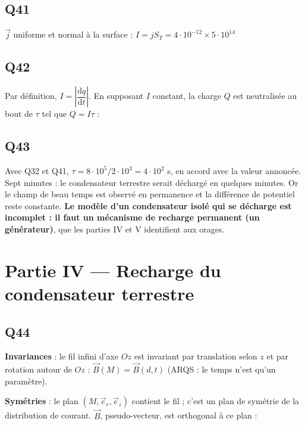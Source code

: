 \documentclass[11pt,a4paper]{article}
\newcommand{\equationajustee}[1]{%
  \sbox{\boiteequation}{$\displaystyle #1$}%
  \ifdim\wd\boiteequation>\linewidth
    \[\resizebox{\linewidth}{!}{\usebox{\boiteequation}}\]%
  \else
    \[#1\]%
  \fi}
\begin{document}
\hypertarget{q41}{%
\subsection{Q41}\label{q41}}

\(\vec j\) uniforme et normal à la surface : \(I=jS_T=4\cdot10^{-12}\times5\cdot10^{14}\)
\equationajustee{\boxed{I\simeq2\cdot10^3\ \mathrm A}}

\hypertarget{q42}{%
\subsection{Q42}\label{q42}}

Par définition, \(I=\left|\dfrac{\mathrm dq}{\mathrm dt}\right|\). En supposant \(I\) constant, la charge \(Q\) est neutralisée au bout de \(\tau\) tel que \(Q=I\tau\) :
\equationajustee{\boxed{\tau=\frac QI}}

\hypertarget{q43}{%
\subsection{Q43}\label{q43}}

Avec Q32 et Q41, \(\tau=8\cdot10^5/2\cdot10^3=4\cdot10^2\) s, en accord avec la valeur annoncée. Sept minutes : le condensateur terrestre serait déchargé en quelques minutes. Or le champ de beau temps est observé en permanence et la différence de potentiel reste constante. \textbf{Le modèle d'un condensateur isolé qui se décharge est incomplet : il faut un mécanisme de recharge permanent (un générateur)}, que les parties IV et V identifient aux orages.

\hypertarget{partie-iv-recharge-du-condensateur-terrestre}{%
\section{Partie IV --- Recharge du condensateur terrestre}\label{partie-iv-recharge-du-condensateur-terrestre}}

\hypertarget{q44}{%
\subsection{Q44}\label{q44}}

\textbf{Invariances} : le fil infini d'axe \(Oz\) est invariant par translation selon \(z\) et par rotation autour de \(Oz\) : \(\vec B(M)=\vec B(d,t)\) (ARQS : le temps n'est qu'un paramètre).

\textbf{Symétries} : le plan \((M,\vec e_r,\vec e_z)\) contient le fil ; c'est un plan de symétrie de la distribution de courant. \(\vec B\), pseudo-vecteur, est orthogonal à ce plan :
\equationajustee{\boxed{\vec B=B(d,t)\,\vec e_\theta}}
\end{document}
